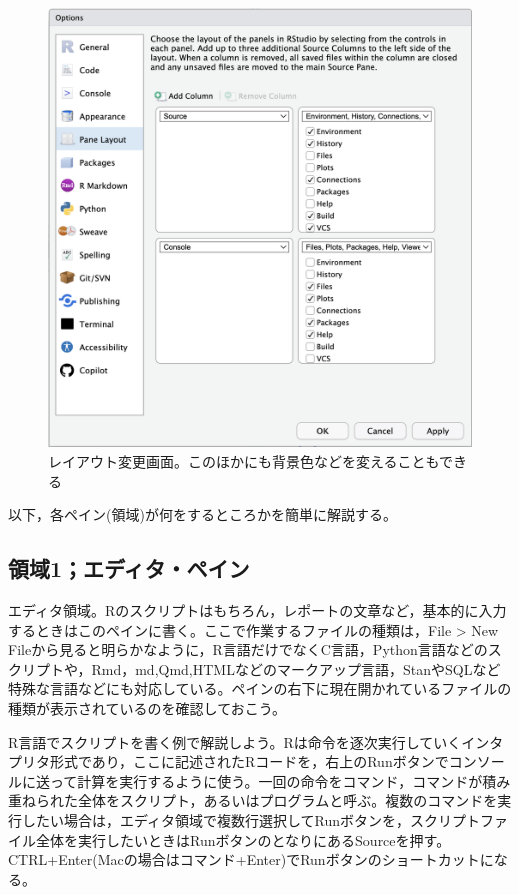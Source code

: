 \documentclass[
  a4paper,
]{ltjsbook}
\begin{document}
\begin{figure}[H]

{\centering \includegraphics{Figs/01_PaneLayout.png}

}

\caption{レイアウト変更画面。このほかにも背景色などを変えることもできる}

\end{figure}%

以下，各ペイン(領域)が何をするところかを簡単に解説する。

\subsection{領域1；エディタ・ペイン}\label{ux9818ux57df1ux30a8ux30c7ux30a3ux30bfux30daux30a4ux30f3}

エディタ領域。Rのスクリプトはもちろん，レポートの文章など，基本的に入力するときはこのペインに書く。ここで作業するファイルの種類は，File
\textgreater{} New
Fileから見ると明らかなように，R言語だけでなくC言語，Python言語などのスクリプトや，Rmd，md,Qmd,HTMLなどのマークアップ言語，StanやSQLなど特殊な言語などにも対応している。ペインの右下に現在開かれているファイルの種類が表示されているのを確認しておこう。

R言語でスクリプトを書く例で解説しよう。Rは命令を逐次実行していくインタプリタ形式であり，ここに記述されたRコードを，右上のRunボタンでコンソールに送って計算を実行するように使う。一回の命令をコマンド，コマンドが積み重ねられた全体をスクリプト，あるいはプログラムと呼ぶ。複数のコマンドを実行したい場合は，エディタ領域で複数行選択してRunボタンを，スクリプトファイル全体を実行したいときはRunボタンのとなりにあるSourceを押す。CTRL+Enter(Macの場合はコマンド+Enter)でRunボタンのショートカットになる。
\end{document}
